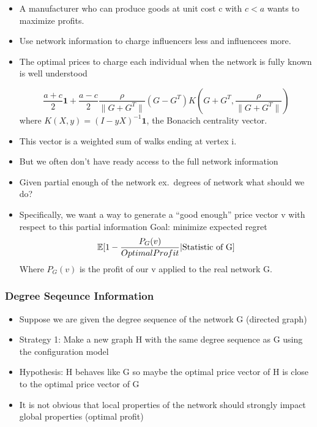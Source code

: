 \documentclass[a4paper,12pt]{beamer}
\begin{document}
\begin{frame}
  \begin{itemize}
    \item A manufacturer who can produce goods at unit cost c with $c < a$ wants to maximize profits.
    \item Use network information to charge influencers less and influencees more.
    \item The optimal prices to charge each individual when the network is fully known is well understood\cite{candogan2012optimal}\cite{huang2021value}

          \begin{equation}
            \frac{a+c}{2} \textbf{1} + \frac{a-c}{2} \frac{\rho}{\| G + G^{T}\|} (G - G^{T}) K(G+G^{T}, \frac{\rho}{\|G+G^{T}\|})
          \end{equation}
          where $K(X, y) = {(I - yX)}^{-1}\textbf{1}$, the Bonacich centrality vector.
          \item This vector is a weighted sum of walks ending at vertex i.
   \end{itemize}
\end{frame}

\begin{frame}
  \begin{itemize}
    \item But we often don't have ready access to the full network information
    \item Given partial enough of the network ex.\ degrees of network what should we do?
    \item Specifically, we want a way to generate a ``good enough'' price vector v with respect to this partial information
          Goal: minimize expected regret
          \begin{equation}
            \mathbb{E} [ 1 - \frac{P_{G}(v)}{Optimal\-Profit} | \text{Statistic of G}]
          \end{equation}
          Where $P_{G}(v)$ is the profit of our v applied to the real network G.
  \end{itemize}
\end{frame}


\begin{frame}
  \frametitle{Degree Seqeunce Information}
  \begin{itemize}
    \item Suppose we are given the degree sequence of the network G (directed graph)
    \item Strategy 1: Make a new graph H with the same degree sequence as G using the configuration model
    \item Hypothesis: H behaves like G so maybe the optimal price vector of H is close to the optimal price vector of G
          \item It is not obvious that local properties of the network should strongly impact global properties (optimal profit)
  \end{itemize}
\end{frame}
\end{document}
